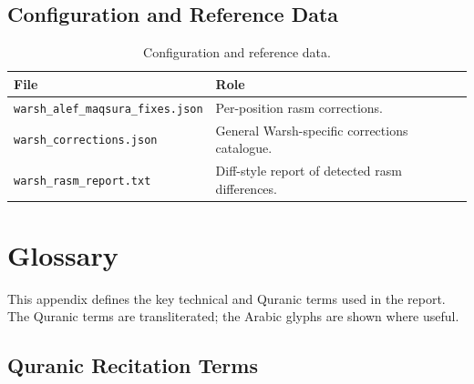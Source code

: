 \section{Configuration and Reference Data}

\begin{table}[H]
  \centering
  \caption{Configuration and reference data.}
  \label{tab:mt_app_config}
  \renewcommand{\arraystretch}{1.3}
  \begin{tabular}{lp{8cm}}
    \toprule
    \textbf{File} & \textbf{Role} \\
    \midrule
    \texttt{warsh\_alef\_maqsura\_fixes.json} & Per-position rasm corrections. \\
    \texttt{warsh\_corrections.json}          & General Warsh-specific corrections catalogue. \\
    \texttt{warsh\_rasm\_report.txt}          & Diff-style report of detected rasm differences. \\
    \bottomrule
  \end{tabular}
\end{table}

\chapter{Glossary}
\label{app:mt_glossary}

This appendix defines the key technical and Quranic terms used in the
report. The Quranic terms are transliterated; the Arabic glyphs are
shown where useful.

\section{Quranic Recitation Terms}

